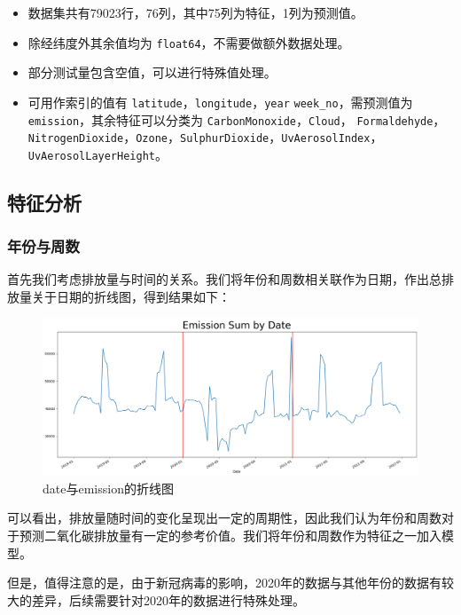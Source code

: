 \documentclass{ctexart}
\begin{document}
\begin{itemize}
      \item 数据集共有79023行，76列，其中75列为特征，1列为预测值。
      \item 除经纬度外其余值均为 \texttt{float64}，不需要做额外数据处理。
      \item 部分测试量包含空值，可以进行特殊值处理。
      \item 可用作索引的值有 \texttt{latitude}，\texttt{longitude}，\texttt{year} \texttt{week\_no}，需预测值为 \texttt{emission}，其余特征可以分类为 \texttt{CarbonMonoxide}，\texttt{Cloud}， \texttt{Formaldehyde}，\texttt{NitrogenDioxide}，\texttt{Ozone}，\texttt{SulphurDioxide}，\texttt{UvAerosolIndex}，\texttt{UvAerosolLayerHeight}。
\end{itemize}

\subsection{特征分析}

\subsubsection{年份与周数}

首先我们考虑排放量与时间的关系。我们将年份和周数相关联作为日期，作出总排放量关于日期的折线图，得到结果如下：

\begin{figure}[H]
      \centering
      \includegraphics[width=1\textwidth]{output2.png}
      \caption{date与emission的折线图}
\end{figure}

可以看出，排放量随时间的变化呈现出一定的周期性，因此我们认为年份和周数对于预测二氧化碳排放量有一定的参考价值。我们将年份和周数作为特征之一加入模型。

但是，值得注意的是，由于新冠病毒的影响，2020年的数据与其他年份的数据有较大的差异，后续需要针对2020年的数据进行特殊处理。
\end{document}
